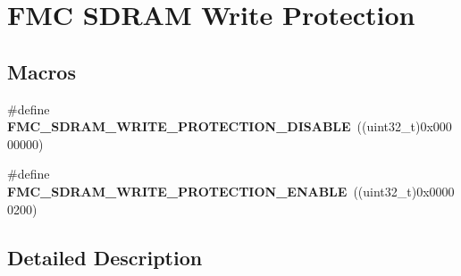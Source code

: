 \hypertarget{group___f_m_c___s_d_r_a_m___write___protection}{}\section{F\+MC S\+D\+R\+AM Write Protection}
\label{group___f_m_c___s_d_r_a_m___write___protection}
\subsection*{Macros}
\begin{DoxyCompactItemize}
\item 
\#define {\bfseries F\+M\+C\+\_\+\+S\+D\+R\+A\+M\+\_\+\+W\+R\+I\+T\+E\+\_\+\+P\+R\+O\+T\+E\+C\+T\+I\+O\+N\+\_\+\+D\+I\+S\+A\+B\+LE}~((uint32\+\_\+t)0x00000000)\hypertarget{group___f_m_c___s_d_r_a_m___write___protection_gac6012236dcde15a636bcff6a8361d081}{}\label{group___f_m_c___s_d_r_a_m___write___protection_gac6012236dcde15a636bcff6a8361d081}

\item 
\#define {\bfseries F\+M\+C\+\_\+\+S\+D\+R\+A\+M\+\_\+\+W\+R\+I\+T\+E\+\_\+\+P\+R\+O\+T\+E\+C\+T\+I\+O\+N\+\_\+\+E\+N\+A\+B\+LE}~((uint32\+\_\+t)0x00000200)\hypertarget{group___f_m_c___s_d_r_a_m___write___protection_ga6ea4cf7132de5ff229c48cafd6998545}{}\label{group___f_m_c___s_d_r_a_m___write___protection_ga6ea4cf7132de5ff229c48cafd6998545}

\end{DoxyCompactItemize}


\subsection{Detailed Description}
